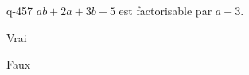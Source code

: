 \begin{truefalse}{q-457}
$ab+2a+3b+5$ est factorisable par $a+3$.
\item Vrai
\item* Faux
\end{truefalse}


